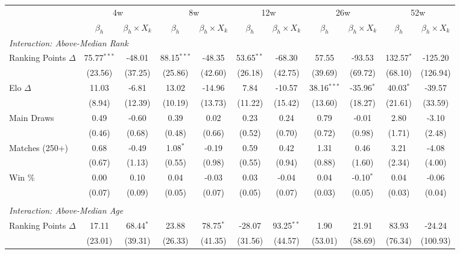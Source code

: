 \begin{tabular}{lcccccccccc}
\toprule
  & \multicolumn{2}{c}{4w} & \multicolumn{2}{c}{8w} & \multicolumn{2}{c}{12w} & \multicolumn{2}{c}{26w} & \multicolumn{2}{c}{52w} \\
\cmidrule(lr){2-3} \cmidrule(lr){4-5} \cmidrule(lr){6-7} \cmidrule(lr){8-9} \cmidrule(lr){10-11} 
  & $\beta_h$ & $\beta_h \times X_k$ & $\beta_h$ & $\beta_h \times X_k$ & $\beta_h$ & $\beta_h \times X_k$ & $\beta_h$ & $\beta_h \times X_k$ & $\beta_h$ & $\beta_h \times X_k$ \\
\midrule
\multicolumn{11}{l}{\textit{Interaction: Above-Median Rank}} \\
\quad Ranking Points $\Delta$ & 75.77$^{***}$ & -48.01 & 88.15$^{***}$ & -48.35 & 53.65$^{**}$ & -68.30 & 57.55 & -93.53 & 132.57$^{*}$ & -125.20 \\
 & (23.56) & (37.25) & (25.86) & (42.60) & (26.18) & (42.75) & (39.69) & (69.72) & (68.10) & (126.94) \\[0.3em]
\quad Elo $\Delta$ & 11.03 & -6.81 & 13.02 & -14.96 & 7.84 & -10.57 & 38.16$^{***}$ & -35.96$^{*}$ & 40.03$^{*}$ & -39.57 \\
 & (8.94) & (12.39) & (10.19) & (13.73) & (11.22) & (15.42) & (13.60) & (18.27) & (21.61) & (33.59) \\[0.3em]
\quad Main Draws & 0.49 & -0.60 & 0.39 & 0.02 & 0.23 & 0.24 & 0.79 & -0.01 & 2.80 & -3.10 \\
 & (0.46) & (0.68) & (0.48) & (0.66) & (0.52) & (0.70) & (0.72) & (0.98) & (1.71) & (2.48) \\[0.3em]
\quad Matches (250+) & 0.68 & -0.49 & 1.08$^{*}$ & -0.19 & 0.59 & 0.42 & 1.31 & 0.46 & 3.21 & -4.08 \\
 & (0.67) & (1.13) & (0.55) & (0.98) & (0.55) & (0.94) & (0.88) & (1.60) & (2.34) & (4.00) \\[0.3em]
\quad Win \% & 0.00 & 0.10 & 0.04 & -0.03 & 0.03 & -0.04 & 0.04 & -0.10$^{*}$ & 0.04 & -0.06 \\
 & (0.07) & (0.09) & (0.05) & (0.07) & (0.05) & (0.07) & (0.03) & (0.05) & (0.03) & (0.04) \\[0.3em]
\\[0.3em]
\multicolumn{11}{l}{\textit{Interaction: Above-Median Age}} \\
\quad Ranking Points $\Delta$ & 17.11 & 68.44$^{*}$ & 23.88 & 78.75$^{*}$ & -28.07 & 93.25$^{**}$ & 1.90 & 21.91 & 83.93 & -24.24 \\
 & (23.01) & (39.31) & (26.33) & (41.35) & (31.56) & (44.57) & (53.01) & (58.69) & (76.34) & (100.93) \\[0.3em]

\end{tabular}
